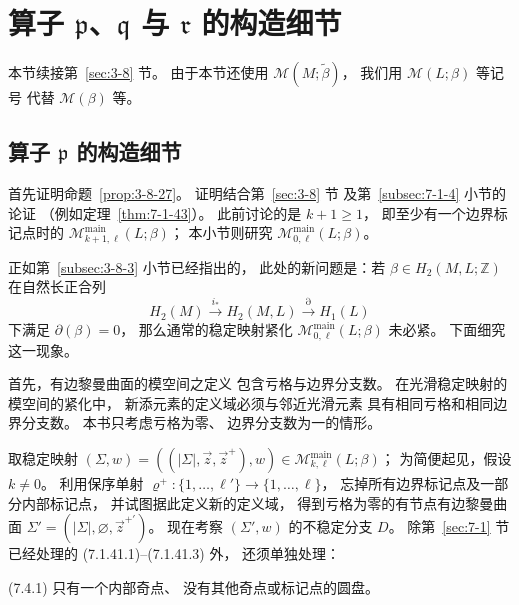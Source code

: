 
\section{算子 $\mathfrak p$、$\mathfrak q$ 与 $\mathfrak r$ 的构造细节}
\label{sec:7-4}

本节续接第~\ref{sec:3-8} 节。
由于本节还使用
$\mathcal M(M;\widetilde\beta)$，
我们用 $\mathcal M(L;\beta)$ 等记号
代替 $\mathcal M(\beta)$ 等。

\subsection{算子 $\mathfrak p$ 的构造细节}
\label{subsec:7-4-1}
%

首先证明命题~\ref{prop:3-8-27}。
证明结合第~\ref{sec:3-8} 节
及第~\ref{subsec:7-1-4} 小节的论证
（例如定理~\ref{thm:7-1-43}）。
此前讨论的是
$k+1\geq1$，
即至少有一个边界标记点时的
$\mathcal M^{\mathrm{main}}_{k+1,\ell}(L;\beta)$；
本小节则研究
$\mathcal M^{\mathrm{main}}_{0,\ell}(L;\beta)$。

正如第~\ref{subsec:3-8-3} 小节已经指出的，
此处的新问题是：若
$\beta\in H_2(M,L;\mathbb Z)$
在自然长正合列
\[
H_2(M)\xrightarrow{i_*}H_2(M,L)
\xrightarrow{\partial}H_1(L)
\]
下满足 $\partial(\beta)=0$，
那么通常的稳定映射紧化
$\mathcal M^{\mathrm{main}}_{0,\ell}(L;\beta)$
未必紧。
下面细究这一现象。

首先，有边黎曼曲面的模空间之定义
包含亏格与边界分支数。
在光滑稳定映射的模空间的紧化中，
新添元素的定义域必须与邻近光滑元素
具有相同亏格和相同边界分支数。
本书只考虑亏格为零、
边界分支数为一的情形。

取稳定映射
$(\Sigma,w)=((|\Sigma|,\vec z,\vec z^+),w)
\in\mathcal M^{\mathrm{main}}_{k,\ell}(L;\beta)$；
为简便起见，假设 $k\ne0$。
利用保序单射
$\varrho^+\colon
\{1,\ldots,\ell'\}\to\{1,\ldots,\ell\}$，
忘掉所有边界标记点及一部分内部标记点，
并试图据此定义新的定义域，
得到亏格为零的有节点有边黎曼曲面
$\Sigma'=(|\Sigma|,\varnothing,\vec z^{+\prime})$。
现在考察
$(\Sigma',w)$ 的不稳定分支 $D$。
除第~\ref{sec:7-1} 节已经处理的
(7.1.41.1)--(7.1.41.3) 外，
还须单独处理：

\par\noindent\textup{(7.4.1)}\label{eq:7-4-1}\quad
只有一个内部奇点、
没有其他奇点或标记点的圆盘。


